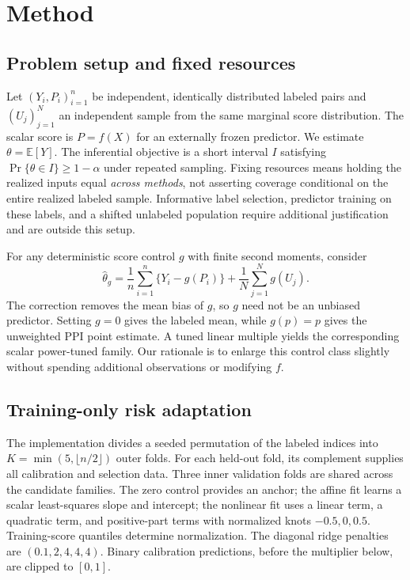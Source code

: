 \documentclass{article}
\newcommand{\E}{\mathbb E}
\begin{document}
\section{Method}
\subsection{Problem setup and fixed resources}
Let $(Y_i,P_i)_{i=1}^{n}$ be independent, identically distributed labeled pairs and $(U_j)_{j=1}^{N}$ an independent sample from the same marginal score distribution. The scalar score is $P=f(X)$ for an externally frozen predictor. We estimate $\theta=\E[Y]$. The inferential objective is a short interval $I$ satisfying $\Pr\{\theta\in I\}\geq 1-\alpha$ under repeated sampling. Fixing resources means holding the realized inputs equal \emph{across methods}, not asserting coverage conditional on the entire realized labeled sample. Informative label selection, predictor training on these labels, and a shifted unlabeled population require additional justification and are outside this setup.

For any deterministic score control $g$ with finite second moments, consider
\begin{equation}
 \widehat\theta_g=\frac1n\sum_{i=1}^n\{Y_i-g(P_i)\}
             +\frac1N\sum_{j=1}^Ng(U_j).
 \label{eq:control}
\end{equation}
The correction removes the mean bias of $g$, so $g$ need not be an unbiased predictor. Setting $g=0$ gives the labeled mean, while $g(p)=p$ gives the unweighted PPI point estimate. A tuned linear multiple yields the corresponding scalar power-tuned family. Our rationale is to enlarge this control class slightly without spending additional observations or modifying $f$.

\subsection{Training-only risk adaptation}
The implementation divides a seeded permutation of the labeled indices into $K=\min(5,\lfloor n/2\rfloor)$ outer folds. For each held-out fold, its complement supplies all calibration and selection data. Three inner validation folds are shared across the candidate families. The zero control provides an anchor; the affine fit learns a scalar least-squares slope and intercept; the nonlinear fit uses a linear term, a quadratic term, and positive-part terms with normalized knots $-0.5,0,0.5$. Training-score quantiles determine normalization. The diagonal ridge penalties are $(0.1,2,4,4,4)$. Binary calibration predictions, before the multiplier below, are clipped to $[0,1]$.
\end{document}
